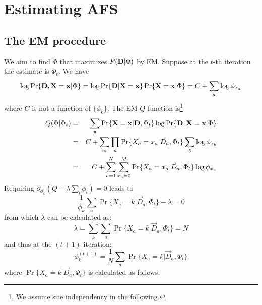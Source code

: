 \documentclass[pdftex,10pt]{book}
\begin{document}
\section{Estimating AFS}\label{sec:afs}
\subsection{The EM procedure}
We aim to find $\Phi$ that maximizes $P({\bf D}|\Phi)$ by EM. Suppose at
the $t$-th iteration the estimate is $\Phi_t$. We have
$$
\log \Pr\{{\bf D},{\bf X}={\bf x}|\Phi\}=\log \Pr\{{\bf D}|{\bf X}={\bf
  x}\}\Pr\{{\bf X}={\bf x}|\Phi\}=C+\sum_a\log \phi_{x_a}
$$
where $C$ is not a function of $\{\phi_k\}$. The EM $Q$ function
is\footnote{We assume site independency in the following.}
\begin{eqnarray*}
  Q(\Phi|\Phi_t)&=&\sum_{\bf x}\Pr\{{\bf X}={\bf x}|{\bf D},\Phi_t\}\log \Pr\{{\bf D},{\bf X}={\bf x}|\Phi\}\\
  &=&C+\sum_{\bf x}\prod_a \Pr\{X_a=x_a|\vec{D}_a,\Phi_t\}\sum_b\log \phi_{x_b}\\
  &=&C+\sum_{a=1}^N\sum_{x_a=0}^M \Pr\{X_a=x_a|\vec{D}_a,\Phi_t\}\log \phi_{x_a}
\end{eqnarray*}
Requiring $\partial_{\phi_k}(Q-\lambda\sum_l{\phi_l})=0$ leads to
$$
\frac{1}{\phi_k}\sum_a\Pr\{X_a=k|\vec{D}_a,\Phi_t\}-\lambda=0
$$
from which $\lambda$ can be calculated as:
$$
\lambda=\sum_k\sum_a \Pr\{X_a=k|\vec{D}_a,\Phi_t\}=N
$$
and thus at the $(t+1)$ iteration:
\begin{equation}\label{equ:em}
  \phi_k^{(t+1)}=\frac{1}{N}\sum_a\Pr\{X_a=k|\vec{D}_a,\Phi_t\}
\end{equation}
where $\Pr\{X_a=k|\vec{D}_a,\Phi_t\}$ is calculated as follows.
\end{document}
